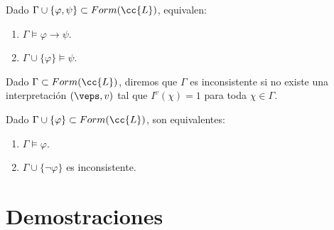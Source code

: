 \begin{teo}[de la Deducción]
    Dado $\Gamma \cup \{\varphi,\psi\}\subset Form(\cc{L})$, equivalen:
    \begin{enumerate}
        \item $\Gamma\vDash\varphi\to\psi$.
        \item $\Gamma\cup\{\varphi\}\vDash\psi$.
    \end{enumerate}
\end{teo}

\begin{definicion}[Inconsistencia]
    Dado $\Gamma\subset Form(\cc{L})$, diremos que $\Gamma$ es inconsistente si no existe una interpretación $(\veps,v)$ tal que $I^v(\chi)=1$ para toda $\chi\in\Gamma$.
\end{definicion}

\begin{teo}
    Dado $\Gamma\cup \{\varphi\}\subset Form(\cc{L})$, son equivalentes:
    \begin{enumerate}
        \item $\Gamma\vDash\varphi$.
        \item $\Gamma\cup\{\neg \varphi\}$ es inconsistente.
    \end{enumerate}
\end{teo}


\section{Demostraciones}


